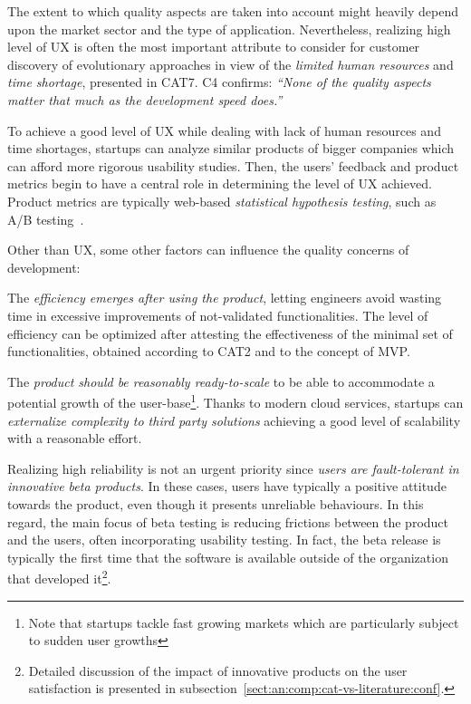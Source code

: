 \documentclass[10pt,journal,letterpaper,compsoc]{IEEEtran}
\begin{document}
The extent to which quality aspects are taken into account might heavily depend
upon the market sector and the type of application. Nevertheless, realizing high
level of UX is often the most important attribute to consider for customer
discovery of evolutionary approaches in view of the \textit{limited human
resources} and \textit{time shortage}, presented in CAT7. C4 confirms:
\textit{``None of the quality aspects matter that much as the development speed
does.''}

To achieve a good level of UX while dealing with lack of human resources and
time shortages, startups can analyze similar products of bigger companies which
can afford more rigorous usability studies. Then, the users' feedback and
product metrics begin to have a central role in determining the level of UX
achieved. Product metrics are typically web-based \textit{statistical hypothesis
testing}, such as A/B testing~\cite{AB}.

Other than UX, some other factors can influence the quality concerns of
development:


\begin{compactitem}

\item The \textit{efficiency emerges after using the product}, letting
engineers avoid wasting time in excessive improvements of not-validated
functionalities. The level of efficiency can be optimized after attesting the
effectiveness of the minimal set of functionalities, obtained according to CAT2
and to the concept of MVP. 
\item The \textit{product should be reasonably ready-to-scale} to be able to 
accommodate a potential growth of the user-base\footnote{Note that startups 
tackle fast growing markets which are particularly subject to sudden user 
growths}. Thanks to modern cloud services, startups can \textit{externalize 
complexity to third party solutions} achieving a good level of scalability with 
a reasonable effort. 
\item Realizing high reliability is not an urgent priority since \textit{users 
are fault-tolerant in innovative beta products}. In these cases, users have 
typically a positive attitude towards the product, even though it presents 
unreliable behaviours. In this regard, the main focus of beta testing is 
reducing frictions between the product and the users, often incorporating 
usability testing. In fact, the beta release is typically the first time that 
the software is available outside of the organization that developed 
it\footnote{Detailed discussion of the impact of innovative products on the user 
satisfaction is presented in 
subsection~\ref{sect:an:comp:cat-vs-literature:conf}.}. 
\end{compactitem}
\end{document}
